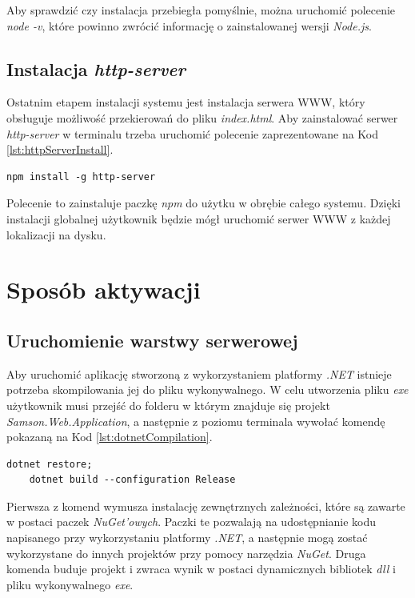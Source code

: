\documentclass[a4paper,twoside,12pt]{book}
\begin{document}
Aby sprawdzić czy instalacja przebiegła pomyślnie, można uruchomić polecenie \textit{node -v}, które powinno zwrócić informację o zainstalowanej wersji \textit{Node.js}.

\subsection {Instalacja \textit{http-server}}
Ostatnim etapem instalacji systemu jest instalacja serwera WWW, który obsługuje możliwość przekierowań do pliku \textit{index.html}. Aby zainstalować serwer \textit{http-server} w terminalu trzeba uruchomić polecenie zaprezentowane na Kod \ref{lst:httpServerInstall}.
\begin{lstlisting}[caption={Instalacja paczki \textit{http-server}}, label={lst:httpServerInstall}]
	npm install -g http-server
\end{lstlisting}

Polecenie to zainstaluje paczkę \textit{npm} do użytku w obrębie całego systemu. Dzięki instalacji globalnej użytkownik będzie mógł uruchomić serwer WWW z każdej lokalizacji na dysku.

\section {Sposób aktywacji}
\subsection{Uruchomienie warstwy serwerowej}
Aby uruchomić aplikację stworzoną z wykorzystaniem platformy \textit{.NET} istnieje potrzeba skompilowania jej do pliku wykonywalnego. W celu utworzenia pliku \textit{exe} użytkownik musi przejść do folderu w którym znajduje się projekt \textit{Samson.Web.Application}, a następnie z poziomu terminala wywołać komendę pokazaną na Kod \ref{lst:dotnetCompilation}.
\begin{lstlisting}[caption={Kompilacja projektu \textit{ASP.NET}}, label={lst:dotnetCompilation}]
	dotnet restore;
	dotnet build --configuration Release
\end{lstlisting}
Pierwsza z komend wymusza instalację zewnętrznych zależności, które są zawarte w postaci paczek \textit{NuGet'owych}. Paczki te pozwalają na udostępnianie kodu napisanego przy wykorzystaniu platformy \textit{.NET}, a następnie mogą zostać wykorzystane do innych projektów przy pomocy narzędzia \textit{NuGet}. Druga komenda buduje projekt i zwraca wynik w postaci dynamicznych bibliotek \textit{dll} i pliku wykonywalnego \textit{exe}.
\end{document}
